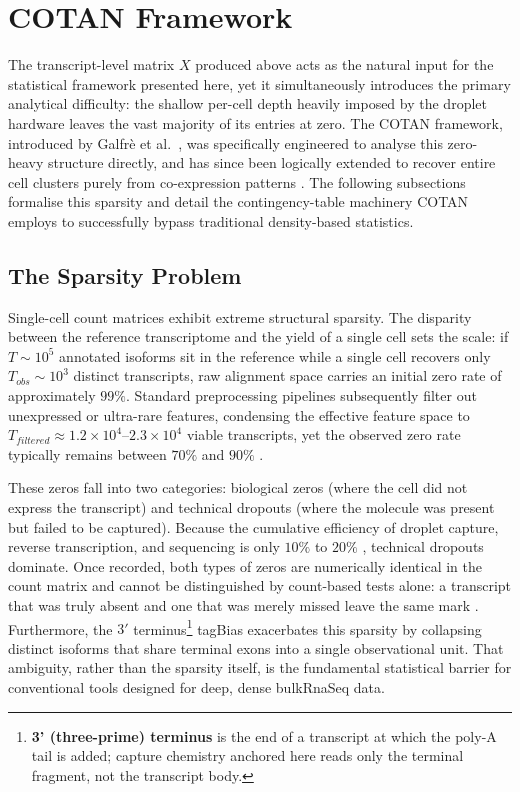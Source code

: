 \section{COTAN Framework}\label{sec:cotan-framework}

The transcript-level matrix $X$ produced above acts as the natural input for the statistical framework presented here, yet it simultaneously introduces the primary analytical difficulty: the shallow per-cell depth heavily imposed by the droplet hardware leaves the vast majority of its entries at zero. The COTAN framework, introduced by Galfr\`e et al.\ \cite{galfre2021cotan}, was specifically engineered to analyse this zero-heavy structure directly, and has since been logically extended to recover entire cell clusters purely from co-expression patterns \cite{galfre2026gene}. The following subsections formalise this sparsity and detail the contingency-table machinery COTAN employs to successfully bypass traditional density-based statistics.

\subsection{The Sparsity Problem}\label{sec:the-sparsity-problem}

Single-cell count matrices exhibit extreme structural sparsity. The disparity between the reference transcriptome and the yield of a single cell sets the scale: if $T \sim 10^5$ annotated isoforms sit in the reference while a single cell recovers only $T_{obs} \sim 10^3$ distinct transcripts, raw alignment space carries an initial zero rate of approximately $99\%$. Standard preprocessing pipelines subsequently filter out unexpressed or ultra-rare features, condensing the effective feature space to $T_{filtered} \approx 1.2 \times 10^4$--$2.3 \times 10^4$ viable transcripts, yet the observed zero rate typically remains between $70\%$ and $90\%$ \cite{galfre2021cotan}.

These zeros fall into two categories: biological zeros (where the cell did not express the transcript) and technical \glspl{dropout} (where the molecule was present but failed to be captured). Because the cumulative efficiency of droplet capture, reverse transcription, and sequencing is only $10\%$ to $20\%$ \cite{jiang2022statistics}, technical dropouts dominate. Once recorded, both types of zeros are numerically identical in the count matrix and cannot be distinguished by count-based tests alone: a transcript that was truly absent and one that was merely missed leave the same mark \cite{sarkar2021separating}. Furthermore, the $3'$ terminus\footnote{\textbf{3' (three-prime) terminus} is the end of a transcript at which the poly-A tail is added; capture chemistry anchored here reads only the terminal fragment, not the transcript body.} \gls{tagBias} exacerbates this sparsity by collapsing distinct isoforms that share terminal exons into a single observational unit. That ambiguity, rather than the sparsity itself, is the fundamental statistical barrier for conventional tools designed for deep, dense \gls{bulkRnaSeq} data.


